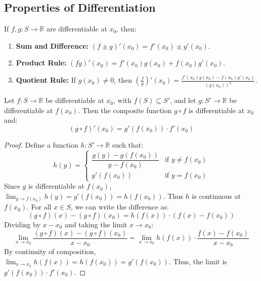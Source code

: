\documentclass[
	UTF-8,
	11pt, %
	a4paper, %
]{LegrandOrangeBook}
\begin{document}
    \newpage

    \subsection{Properties of Differentiation}

    \begin{theorem}
    If $f, g: S \to \mathbb{R}$ are differentiable at $x_0$, then:
    \begin{enumerate}
        \item \textbf{Sum and Difference:} $(f \pm g)'(x_0) = f'(x_0) \pm g'(x_0)$.
        \item \textbf{Product Rule:} $(fg)'(x_0) = f'(x_0)g(x_0) + f(x_0)g'(x_0)$.
        \item \textbf{Quotient Rule:} If $g(x_0) \neq 0$, 
        then $(\frac{f}{g})'(x_0) = \frac{f'(x_0)g(x_0) - f(x_0)g'(x_0)}{(g(x_0))^2}$.
    \end{enumerate}
    \end{theorem}

    \begin{theorem}
    Let $f: S \to \mathbb{R}$ be differentiable at $x_0$, with $f(S) \subseteq S'$, and let $g: S' \to \mathbb{R}$ be differentiable at $f(x_0)$.
    Then the composite function $g \circ f$ is differentiable at $x_0$ and:
    \[ (g \circ f)'(x_0) = g'(f(x_0)) \cdot f'(x_0) \]
    \end{theorem}

    \begin{proof}
    Define a function $h: S' \to \mathbb{R}$ such that:
    \[
    h(y) = \begin{cases} 
    \dfrac{g(y) - g(f(x_0))}{y - f(x_0)} & \text{if } y \neq f(x_0) \\
    g'(f(x_0)) & \text{if } y = f(x_0)
    \end{cases}
    \]
    Since $g$ is differentiable at $f(x_0)$, $\lim_{y \to f(x_0)} h(y) = g'(f(x_0)) = h(f(x_0))$. Thus $h$ is continuous at $f(x_0)$.
    For all $x \in S$, we can write the difference as:
    \[ (g \circ f)(x) - (g \circ f)(x_0) = h(f(x)) \cdot (f(x) - f(x_0)) \]
    Dividing by $x - x_0$ and taking the limit $x \to x_0$:
    \[ \lim_{x \to x_0} \frac{(g \circ f)(x) - (g \circ f)(x_0)}{x - x_0} = \lim_{x \to x_0} h(f(x)) \cdot \frac{f(x) - f(x_0)}{x - x_0} \]
    By continuity of composition, $\lim_{x \to x_0} h(f(x)) = h(f(x_0)) = g'(f(x_0))$.
    Thus, the limit is $g'(f(x_0)) \cdot f'(x_0)$.
    \end{proof}
\end{document}
